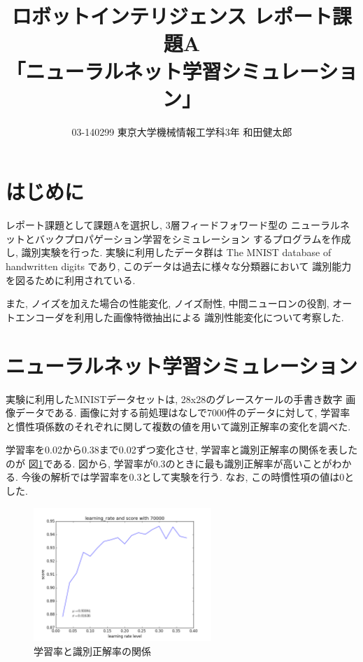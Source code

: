 \documentclass[10pt]{jarticle}
\title{ロボットインテリジェンス レポート課題A \\
      「ニューラルネット学習シミュレーション」}
\author{03-140299 東京大学機械情報工学科3年 和田健太郎}
\begin{document}
\maketitle

\section{はじめに}
レポート課題として課題Aを選択し, 3層フィードフォワード型の
ニューラルネットとバックプロパゲーション学習をシミュレーション
するプログラムを作成し, 識別実験を行った. 
実験に利用したデータ群は
The MNIST database of handwritten digits
であり, このデータは過去に様々な分類器において
識別能力を図るために利用されている. \cite{mnist}

また, ノイズを加えた場合の性能変化, ノイズ耐性, 
中間ニューロンの役割, オートエンコーダを利用した画像特徴抽出による
識別性能変化について考察した. 

\section{ニューラルネット学習シミュレーション}
実験に利用したMNISTデータセットは, 28x28のグレースケールの手書き数字
画像データである. 画像に対する前処理はなしで7000件のデータに対して,
学習率と慣性項係数のそれぞれに関して複数の値を用いて識別正解率の変化を調べた. 

学習率を0.02から0.38まで0.02ずつ変化させ, 学習率と識別正解率の関係を表したのが
図\ref{fig:learning-rate-score-var}である. 
図から, 学習率が0.3のときに最も識別正解率が高いことがわかる. 
今後の解析では学習率を0.3として実験を行う. なお, この時慣性項の値は0とした. 
\begin{figure}[hbtp]
  \centering
  \includegraphics[width=0.6\textwidth]{assets/img/learning_rate_test_mnist_70000.pdf}
  \caption{学習率と識別正解率の関係}
  \label{fig:learning-rate-score-var}
\end{figure}
\end{document}
